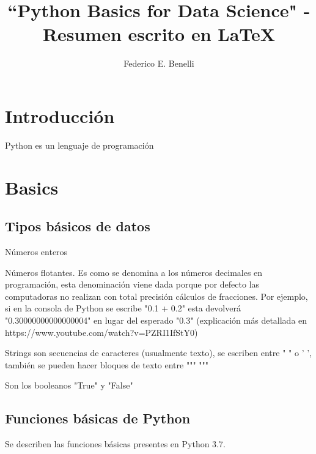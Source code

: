 \documentclass[10pt,a4paper]{article}
\author{Federico E. Benelli}
\title{``Python Basics for Data Science" - Resumen escrito en \LaTeX{}}
\begin{document}
\maketitle
\tableofcontents
\newpage

\section{Introducción}
Python es un lenguaje de programación

\section{Basics}

\subsection{Tipos básicos de datos}

\begin{description}[
align=right,
labelindent = 1cm,
labelsep=0.5cm,
itemindent=0cm]

\item [Integer]Números enteros
\item [Float]Números flotantes. Es como se denomina a los números decimales en programación, esta denominación viene dada porque por defecto las computadoras no realizan con total precisión cálculos de fracciones. Por ejemplo, si en la consola de Python se escribe "0.1 + 0.2" esta devolverá "0.30000000000000004" en lugar del esperado "0.3" (explicación más detallada en https://www.youtube.com/watch?v=PZRI1IfStY0)
\item [String]Strings son secuencias de caracteres (usualmente texto), se escriben entre " " o ' ', también se pueden hacer bloques de texto entre """ """
\item [Boolean] Son los booleanos "True" y "False"
\end{description}

\subsection{Funciones básicas de Python}
Se describen las funciones básicas presentes en Python 3.7. 
\end{document}
